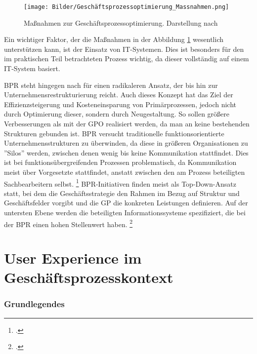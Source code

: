 \begin{figure}[H]
    \centering
    \texttt{[image: Bilder/Geschäftsprozessoptimierung\_Massnahmen.png]}
    \caption[Ma\ss nahmen zur Geschäftsprozessoptimierung]{Ma\ss nahmen zur Geschäftsprozessoptimierung. Darstellung nach \cite[][]{theorie_bleicher_organisation_1991}}
    \label{fig:Geschäftsprozessoptimierung_Massnahmen}
\end{figure}

Ein wichtiger Faktor, der die Ma\ss nahmen in der Abbildung \ref{fig:Geschäftsprozessoptimierung_Massnahmen} wesentlich unterstützen kann, ist der Einsatz von IT-Systemen. Dies ist besonders für den im praktischen Teil betrachteten Prozess wichtig, da dieser vollständig auf einem IT-System basiert.

BPR steht hingegen nach \cite[][]{theorie_hammer_champy_business_reengineering_1996} für einen radikaleren Ansatz, der bis hin zur Unternehmensrestrukturierung reicht. Auch dieses Konzept hat das Ziel der Effizienzsteigerung und Kosteneinsparung von Primärprozessen, jedoch nicht durch Optimierung dieser, sondern durch Neugestaltung. So sollen grö\ss ere Verbesserungen als mit der GPO realisiert werden, da man an keine bestehenden Strukturen gebunden ist. BPR versucht traditionelle funktionsorientierte Unternehmensstrukturen zu überwinden, da diese in grö\ss eren Organisationen zu ''Silos'' werden, zwischen denen wenig bis keine Kommunikation stattfindet. Dies ist bei funktionsübergreifenden Prozessen problematisch, da Kommunikation meist über Vorgesetzte stattfindet, anstatt zwischen den am Prozess beteiligten Sachbearbeitern selbst. \footcite[Vgl.][S. 12f]{theorie_gadatsch_grundkurs_geschäftsprozessmanagement_2010} BPR-Initiativen finden meist als Top-Down-Ansatz statt, bei dem die Geschäftsstrategie den Rahmen im Bezug auf Struktur und Geschäftsfelder vorgibt und die GP die konkreten Leistungen definieren. Auf der untersten Ebene werden die beteiligten Informationssysteme spezifiziert, die bei der BPR einen hohen Stellenwert haben. \footcite[Vgl.][S. 24]{theorie_osterle_business_1995}

\section{User Experience im Geschäftsprozesskontext}

\subsubsection{Grundlegendes}

